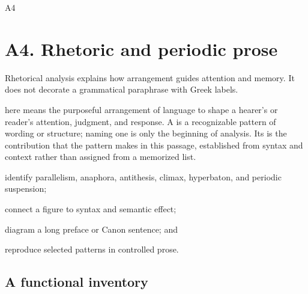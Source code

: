 \begin{courseunit}{A4}
\chapter{A4. Rhetoric and periodic prose}

Rhetorical analysis explains how arrangement guides attention and memory. It
does not decorate a grammatical paraphrase with Greek labels.

 here means the purposeful arrangement of language to shape a
hearer's or reader's attention, judgment, and response. A  is a
recognizable pattern of wording or structure; naming one is only the beginning
of analysis. Its  is the contribution that the pattern makes in
this passage, established from syntax and context rather than assigned from a
memorized list.

\begin{learningobjectives}
  \item identify parallelism, anaphora, antithesis, climax, hyperbaton, and
        periodic suspension;
  \item connect a figure to syntax and semantic effect;
  \item diagram a long preface or Canon sentence; and
  \item reproduce selected patterns in controlled prose.
\end{learningobjectives}

\section{A functional inventory}


\end{courseunit}
